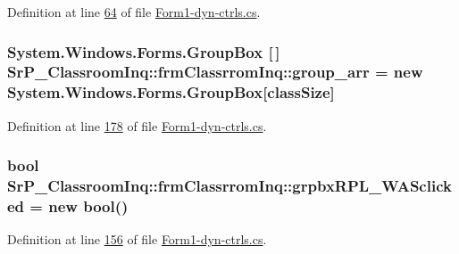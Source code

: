 \-Definition at line \hyperlink{_form1-dyn-ctrls_8cs_source_l00064}{64} of file \hyperlink{_form1-dyn-ctrls_8cs_source}{\-Form1-\/dyn-\/ctrls.\-cs}.

\hypertarget{class_sr_p___classroom_inq_1_1frm_classrrom_inq_a68d2b307c87e71592f6e170c9ce2aad2}{
\subsubsection[{group\-\_\-arr}]{\setlength{\rightskip}{0pt plus 5cm}\-System.\-Windows.\-Forms.\-Group\-Box \mbox{[}$\,$\mbox{]} {\bf \-Sr\-P\-\_\-\-Classroom\-Inq\-::frm\-Classrrom\-Inq\-::group\-\_\-arr} = new \-System.\-Windows.\-Forms.\-Group\-Box\mbox{[}{\bf class\-Size}\mbox{]}}}
\label{class_sr_p___classroom_inq_1_1frm_classrrom_inq_a68d2b307c87e71592f6e170c9ce2aad2}


\-Definition at line \hyperlink{_form1-dyn-ctrls_8cs_source_l00178}{178} of file \hyperlink{_form1-dyn-ctrls_8cs_source}{\-Form1-\/dyn-\/ctrls.\-cs}.

\hypertarget{class_sr_p___classroom_inq_1_1frm_classrrom_inq_a97ab9f8512cd6b2f9648651d5c5d404b}{
\subsubsection[{grpbx\-R\-P\-L\-\_\-\-W\-A\-Sclicked}]{\setlength{\rightskip}{0pt plus 5cm}bool {\bf \-Sr\-P\-\_\-\-Classroom\-Inq\-::frm\-Classrrom\-Inq\-::grpbx\-R\-P\-L\-\_\-\-W\-A\-Sclicked} = new bool()}}
\label{class_sr_p___classroom_inq_1_1frm_classrrom_inq_a97ab9f8512cd6b2f9648651d5c5d404b}


\-Definition at line \hyperlink{_form1-dyn-ctrls_8cs_source_l00156}{156} of file \hyperlink{_form1-dyn-ctrls_8cs_source}{\-Form1-\/dyn-\/ctrls.\-cs}.

